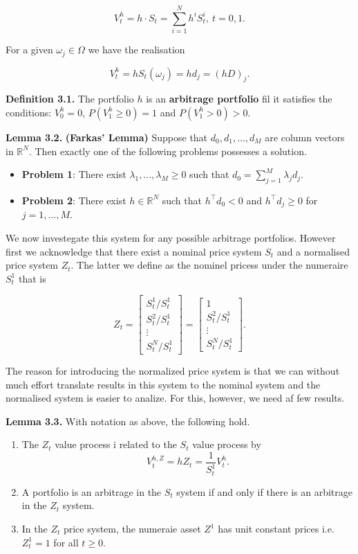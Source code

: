 \documentclass[
]{article}
\providecommand{\tightlist}{%
  \setlength{\itemsep}{0pt}\setlength{\parskip}{0pt}}
\begin{document}
\[
V^h_t=h\cdot S_t=\sum_{i=1}^N h^iS_t^i,\ t=0,1.
\]

For a given \(\omega_j\in\Omega\) we have the realisation

\[
V_t^h=hS_t(\omega_j)=hd_j=(hD)_j.
\]

\textbf{Definition 3.1.} The portfolio \(h\) is an \textbf{arbitrage
portfolio} fil it satisfies the conditions: \(V_0^h=0\),
\(P(V_1^h\ge 0)=1\) and \(P(V_1^h>0)>0\).

\textbf{Lemma 3.2.} \textbf{(Farkas' Lemma)} Suppose that
\(d_0,d_1,...,d_M\) are column vectors in \(\mathbb{R}^N\). Then exactly
one of the following problems possesses a solution.

\begin{itemize}
\tightlist
\item
  \textbf{Problem 1}: There exist \(\lambda_1,...,\lambda_M\ge0\) such
  that \(d_0=\sum_{j=1}^M\lambda_jd_j\).
\item
  \textbf{Problem 2}: There exist \(h\in\mathbb{R}^N\) such that
  \(h^\top d_0<0\) and \(h^\top d_j\ge 0\) for \(j=1,...,M\).
\end{itemize}

We now investegate this system for any possible arbitrage portfolios.
However first we acknowledge that there exist a nominal price system
\(S_t\) and a normalised price system \(Z_t\). The latter we define as
the nominel pricess under the numeraire \(S_t^1\) that is

\[
Z_t=\begin{bmatrix} S_t^1/S_t^1\\
S_t^2/S_t^1\\
\vdots\\
S_t^N/S_t^1\end{bmatrix}=\begin{bmatrix} 1\\
S_t^2/S_t^1\\
\vdots\\
S_t^N/S_t^1\end{bmatrix}.
\]

The reason for introducing the normalized price system is that we can
without much effort translate results in this system to the nominal
system and the normalised system is easier to analize. For this,
however, we need af few results.

\textbf{Lemma 3.3.} With notation as above, the following hold.

\begin{enumerate}
\def\labelenumi{\arabic{enumi}.}
\tightlist
\item
  The \(Z_t\) value process i related to the \(S_t\) value process by \[
    V_t^{h,Z}=hZ_t=\frac{1}{S_t^1}V_t^h.
    \]
\item
  A portfolio is an arbitrage in the \(S_t\) system if and only if there
  is an arbitrage in the \(Z_t\) system.
\item
  In the \(Z_t\) price system, the numeraie asset \(Z^1\) has unit
  constant prices i.e.~\(Z_t^1=1\) for all \(t\ge 0\).
\end{enumerate}
\end{document}
